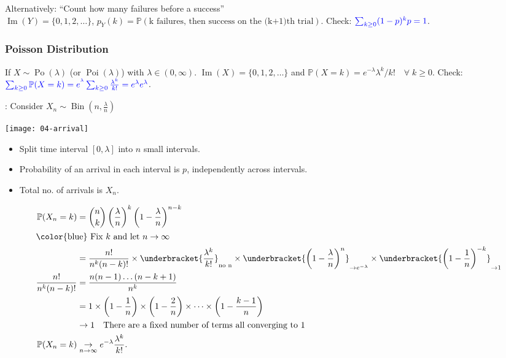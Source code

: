 Alternatively: ``Count how many failures before a success'' \\
$\operatorname{Im}(Y) = \{0, 1, 2, \dots\}$, $p_Y(k) = \mathbb{P}(\text{k failures, then success on the (k+1)th trial})$.
\color{blue} Check: $\mathcolor{blue}{\sum_{k \geq 0} (1-p)^{k} p = 1}$.\color{black}

\subsubsection{Poisson Distribution}
If $X \sim \operatorname{Po}(\lambda)$ (or $\operatorname{Poi}(\lambda)$) with $\lambda \in (0, \infty)$.
$\operatorname{Im}(X) = \{0, 1, 2, \dots\}$ and $\mathbb{P}(X = k) = e^{- \lambda} \lambda^k / k! \quad \forall \; k \geq 0$.
\color{blue} Check: $\mathcolor{blue}{\sum_{k \geq 0} \mathbb{P}(X = k) = e^{^\lambda} \sum_{k \geq 0} \frac{\lambda^k}{k!} = e^{\lambda} e^\lambda}$.\color{black}

: Consider $X_n \sim \operatorname{Bin}(n, \frac{\lambda}{n})$
    \begin{example}
    {\par \centering \texttt{[image: 04-arrival]} \par}
    \begin{itemize}
        \item Split time interval $[0, \lambda]$ into $n$ small intervals.
        \item Probability of an arrival in each interval is $p$, independently across intervals.
        \item Total no. of arrivals is $X_n$.
    \end{itemize} 

    \begin{align*}
        \mathbb{P}(X_n = k) &= \binom{n}{k} \left(\frac{\lambda}{n}\right)^k \left(1 - \frac{\lambda}{n}\right)^{n - k} \\
        \intertext{\color{blue} Fix $k$ and let $n \to \infty$}
        &= \frac{n!}{n^k (n - k)!} \times \underbracket{\frac{\lambda^k}{k!}}_{\text{no n}} \times \underbracket{\left(1 - \frac{\lambda}{n}\right)^n}_{\to e^{-\lambda}} \times \underbracket{\left(1 - \frac{1}{n}\right)^{-k}}_{\to 1} \\
        \frac{n!}{n^k (n - k)!} &= \frac{n (n-1) \dots (n - k + 1)}{n^k} \\
        &= 1 \times \left(1 - \frac{1}{n}\right) \times \left(1 - \frac{2}{n}\right) \times \dots \times \left(1 - \frac{k - 1}{n}\right) \\
        &\to 1 \quad \text{There are a fixed number of terms all converging to 1} \\
        \mathbb{P}(X_n = k) &\underset{n \to \infty}{\to} e^{-\lambda} \frac{\lambda^k}{k!}.
    \end{align*} 
\end{example} 